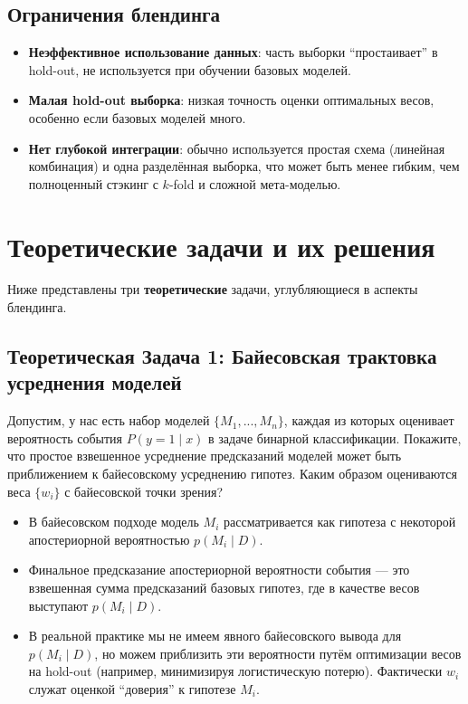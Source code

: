 \subsection{Ограничения блендинга}
\begin{itemize}
    \item \textbf{Неэффективное использование данных}: часть выборки ``простаивает'' в hold-out, не используется при обучении базовых моделей.
    \item \textbf{Малая hold-out выборка}: низкая точность оценки оптимальных весов, особенно если базовых моделей много.
    \item \textbf{Нет глубокой интеграции}: обычно используется простая схема (линейная комбинация) и одна разделённая выборка, что может быть менее гибким, чем полноценный стэкинг с $k$-fold и сложной мета-моделью.
\end{itemize}

\section{Теоретические задачи и их решения}

Ниже представлены три \textbf{теоретические} задачи, углубляющиеся в аспекты блендинга.

\subsection{Теоретическая Задача 1: Байесовская трактовка усреднения моделей}
Допустим, у нас есть набор моделей $\{M_1, ..., M_n\}$, каждая из которых оценивает вероятность события $P(y=1 \mid x)$ в задаче бинарной классификации. Покажите, что простое взвешенное усреднение предсказаний моделей может быть приближением к байесовскому усреднению гипотез. Каким образом оцениваются веса $\{w_i\}$ с байесовской точки зрения?

\begin{itemize}
    \item В байесовском подходе модель $M_i$ рассматривается как гипотеза с некоторой апостериорной вероятностью $p(M_i \mid D)$.
    \item Финальное предсказание апостериорной вероятности события --- это взвешенная сумма предсказаний базовых гипотез, где в качестве весов выступают $p(M_i\mid D)$.
    \item В реальной практике мы не имеем явного байесовского вывода для $p(M_i\mid D)$, но можем приблизить эти вероятности путём оптимизации весов на hold-out (например, минимизируя логистическую потерю). Фактически $w_i$ служат оценкой ``доверия'' к гипотезе $M_i$.
\end{itemize}

